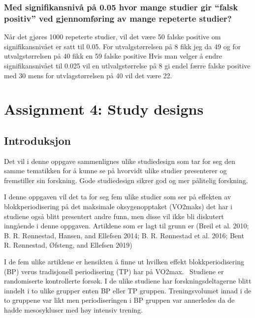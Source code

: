\documentclass[
  letterpaper,
  DIV=11,
  numbers=noendperiod]{scrreprt}
\begin{document}
\subsection{Med signifikansnivå på 0.05 hvor mange studier gir ``falsk
positiv'' ved gjennomføring av mange repeterte
studier?}\label{med-signifikansnivuxe5-puxe5-0.05-hvor-mange-studier-gir-falsk-positiv-ved-gjennomfuxf8ring-av-mange-repeterte-studier}

Når det gjøres 1000 repeterte studier, vil det være 50 falske positive
om signifikansnivået er satt til 0.05. For utvalgstørrelsen på 8 fikk
jeg da 49 og for utvalgstørrelsen på 40 fikk en 59 falske positive Hvis
man velger å endre signifikansnivået til 0.025 vil en utlvalgstørrelse
på 8 gi endel færre falske positive med 30 mens for utvlagstørrelsen på
40 vil det være 22.


\chapter{Assignment 4: Study designs}\label{assignment-4-study-designs}

\section{Introduksjon}\label{introduksjon-3}

Det vil i denne oppgave sammenlignes ulike studiedesign som tar for seg
den samme tematikken for å kunne se på hvorvidt ulike studier
presenterer og fremstiller sin forskning. Gode studiedesign sikrer god
og mer pålitelig forskning.

I denne oppgaven vil det ta for seg fem ulike studier som ser på
effekten av blokkperiodisering på det maksimale oksygenopptaket
(VO2maks) det har i studiene også blitt presentert andre funn, men disse
vil ikke bli diskutert inngående i denne oppgaven. Artiklene som er lagt
til grunn er (Breil et al. 2010; B. R. Rønnestad, Hansen, and Ellefsen
2014; B. R. Rønnestad et al. 2016; Bent R. Rønnestad, Øfsteng, and
Ellefsen 2019)

I de fem ulike artiklene er hensikten å finne ut hvilken effekt
blokkperiodisering (BP) verus tradisjonell periodisering (TP) har på
VO2max.~ Studiene er randomiserte kontrollerte forsøk. I de ulike
studiene har forskningsdeltagerne blitt inndelt i to ulike grupper enten
BP eller TP gruppen. Treningsvolumet innad i de to gruppene var likt men
periodiseringen i BP gruppen var annerledes da de hadde mesosykluser med
høy intensiv trening.
\end{document}
